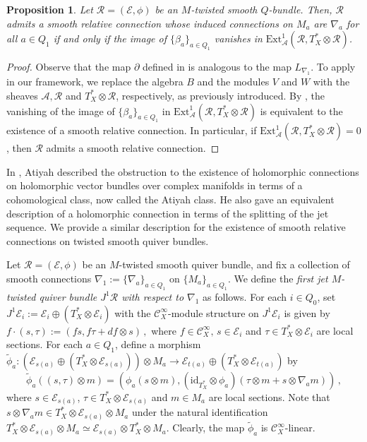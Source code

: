 \documentclass[12pt, reqno]{amsart}
\theoremstyle{plain}
\newtheorem{proposition}[theorem]{Proposition}
\numberwithin{equation}{section}
\newcommand{\E}{\mathcal{E}}
\begin{document}
	\begin{proposition}\label{P: L-map}
		Let $\mathcal{R}=(\E, \phi)$ be an $M$-twisted smooth $Q$-bundle. Then, $\mathcal{R}$ admits a smooth relative connection whose induced connections on $M_a$ are $\nabla_a$ for all $a\in Q_1$ if and only if the image of $\{\beta_a\}_{a\in Q_1}$ vanishes in $\mathrm{Ext}^1_{\mathcal{A}}(\mathcal{R}, T_X^* \otimes \mathcal{R})$.
	\end{proposition}
	\begin{proof}
		Observe that the map $\partial$  defined in \cite[Theorem 4.1]{GK} is analogous to the map $L_{\nabla_1}$. To apply \cite[Theorem 4.1]{GK} in our framework, we replace the algebra $B$ and the modules $V$ and $W$ with the sheaves $\mathcal{A}, \mathcal{R}$ and $T^*_X \otimes \mathcal{R}$, respectively, as previously introduced. By
		\cite[Theorem 4.1]{GK}, the vanishing of the image of $\{\beta_a\}_{a\in Q_1}$ in $\mathrm{Ext}^1_{\mathcal{A}}(\mathcal{R}, T_X^* \otimes \mathcal{R})$ is equivalent to the existence of a smooth relative connection. In particular, if $\mathrm{Ext}^1_{\mathcal{A}}(\mathcal{R}, T_X^* \otimes \mathcal{R})=0$, then $\mathcal{R}$ admits a smooth relative connection.
	\end{proof}
	
	In \cite{At}, Atiyah described the obstruction to the existence of holomorphic connections on holomorphic vector bundles over complex manifolds in terms of a cohomological class, now called the Atiyah class. He also gave an equivalent description of a holomorphic connection in terms of the splitting of the jet sequence. We provide a similar description for the existence of smooth relative connections on twisted smooth quiver bundles.
		
	Let $\mathcal{R}=(\mathcal{E},\phi)$ be an $M$-twisted smooth quiver bundle, and fix a collection of smooth connections $\nabla_1:=\{ \nabla_{a}\}_{a\in Q_1}$ on $\{M_a\}_{a\in Q_1}$. We define the \emph{first jet $M$-twisted quiver bundle $J^1\mathcal{R}$ with respect to $\nabla_{1}$} as follows. For each $i\in Q_0$, set $J^1\mathcal{E}_i:=\mathcal{E}_i \oplus (T^*_{X}\otimes \mathcal{E}_i)$ with the $\mathcal{C}_X^{\infty}$-module structure on $J^1\mathcal{E}_i$ is given by 
	$f\cdot(s,\tau):=(fs,f\tau + df\otimes s)\,,$
	where $f\in \mathcal{C}_X^{\infty},\, s\in \mathcal{E}_i$ and $\tau\in T^*_{X}\otimes \mathcal{E}_{i}$ are local sections. For each $a\in Q_1$, define a morphism $\tilde{\phi}_{a}: \left(\mathcal{E}_{s(a)} \oplus (T^*_{X}\otimes \mathcal{E}_{s(a)})\right)\otimes M_a \rightarrow \mathcal{E}_{t(a)} \oplus \left(T^*_{X}\otimes \mathcal{E}_{t(a)}\right)$ by 
	$$\tilde{\phi}_a\left((s,\tau)\otimes m\right)=\left(\phi_a(s\otimes m), (\mathrm{id}_{T^*_X}\otimes \phi_a)(\tau \otimes m + s\otimes \nabla_a m)\right)\,,$$
	where $s \in \mathcal{E}_{s(a)}$, $\tau \in T_X^* \otimes \mathcal{E}_{s(a)}$ and $m\in M_a$ are local sections. Note that $s\otimes \nabla_am\in T_X^*\otimes \mathcal{E}_{s(a)}\otimes M_a$ under the natural identification $T_X^*\otimes \mathcal{E}_{s(a)}\otimes M_a\simeq \mathcal{E}_{s(a)}\otimes T_X^* \otimes M_a$.  Clearly, the map $\tilde{\phi}_a$ is $\mathcal{C}_X^{\infty}$-linear.
	
\end{document}
